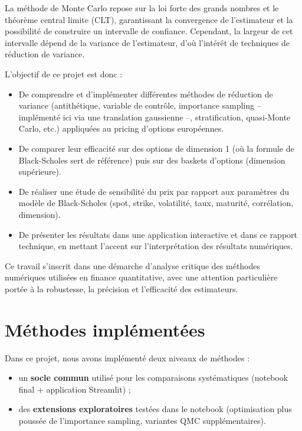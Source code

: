 ﻿\documentclass[11pt,a4paper]{article}
\begin{document}
La méthode de Monte Carlo repose sur la loi forte des grands nombres et le théorème central limite (CLT), garantissant la convergence de l'estimateur et la possibilité de construire un intervalle de confiance. Cependant, la largeur de cet intervalle dépend de la variance de l'estimateur, d'où l'intérêt de techniques de réduction de variance.

L'objectif de ce projet est donc :
\begin{itemize}
    \item De comprendre et d'implémenter différentes méthodes de réduction de variance (antithétique, variable de contrôle, importance sampling -- implémenté ici via une translation gaussienne --, stratification, quasi-Monte Carlo, etc.) appliquées au pricing d'options européennes.
    \item De comparer leur efficacité sur des options de dimension 1 (où la formule de Black-Scholes sert de référence) puis sur des baskets d'options (dimension supérieure).
    \item De réaliser une étude de sensibilité du prix par rapport aux paramètres du modèle de Black-Scholes (spot, strike, volatilité, taux, maturité, corrélation, dimension).
    \item De présenter les résultats dans une application interactive et dans ce rapport technique, en mettant l'accent sur l'interprétation des résultats numériques.
\end{itemize}

Ce travail s'inscrit dans une démarche d'analyse critique des méthodes numériques utilisées en finance quantitative, avec une attention particulière portée à la robustesse, la précision et l'efficacité des estimateurs.

\section{Méthodes implémentées}

Dans ce projet, nous avons implémenté deux niveaux de méthodes :
\begin{itemize}
    \item un \textbf{socle commun} utilisé pour les comparaisons systématiques (notebook final + application Streamlit) ;
    \item des \textbf{extensions exploratoires} testées dans le notebook (optimisation plus poussée de l'importance sampling, variantes QMC supplémentaires).
\end{itemize}
\end{document}
